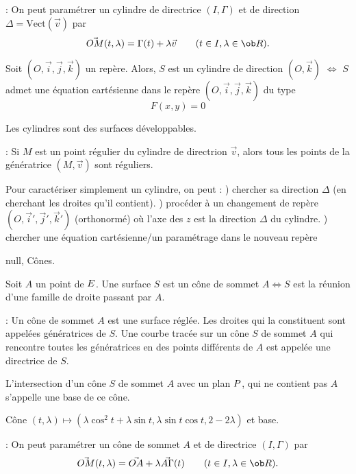 \Remarque : On peut paramétrer un cylindre de directrice $(I,\Gamma)$ et de direction $\Delta=\mbox{Vect}(\vec v)$ par 
$$
\vec{OM}(t,\lambda)=\Gamma(t)+\lambda\vec v\qquad(t\in I,\lambda\in\ob R).
$$

\Propriete [] Soit $(O,\vec i,\vec j,\vec k)$ un repère. 
Alors, $S$ est un cylindre de direction $(O,\vec k)$ $\Longleftrightarrow$ 
$S$ admet une équation cartésienne dans le repère $(O,\vec i,\vec j,\vec k)$ du type 
$$
F(x,y)=0
$$

\Propriete [] Les cylindres sont des surfaces développables. 
\bigskip

\Remarque : Si $M$ est un point régulier du cylindre de directrion $\vec v$, alors 
tous les points de la génératrice $(M,\vec v)$ sont réguliers. 
\bigskip

\Methode [] Pour caractériser simplement un cylindre, on peut : ) chercher sa direction $\Delta$ (en cherchant les droites qu'il contient). ) procéder à un changement de repère $(O,\vec i',\vec j',\vec k')$ (orthonormé) où l'axe des $z$ 
est la direction $\Delta$ du cylindre. ) chercher une équation cartésienne/un paramétrage dans le nouveau repère
\bigskip\goodbreak

\Subsection null, Cônes.

\Definition [] Soit $A$ un point de $\sc E$. Une surface $S$ est 
un cône de sommet $A\Longleftrightarrow S$ est la réunion 
d'une famille de droite passant par $A$. 
\bigskip

\Remarque : Un cône de sommet $A$ est une surface réglée. \pn 
Les droites qui la constituent sont appelées génératrices de $S$. \pn
Une courbe tracée sur un cône $S$ de sommet $A$ 
qui rencontre toutes les génératrices en des points différents de $A$ 
est appelée une directrice de $S$. 
\bigskip

\Definition [] L'intersection d'un cône $S$ de sommet $A$ avec un plan $\sc P$, 
qui ne contient pas $A$ s'appelle une base de ce cône. 
\bigskip

\centerline{%
}%
\Figure [Index=Surfaces!Cone@Cône]  Cône 
$(t,\lambda)\mapsto (\lambda\cos^2t+\lambda\sin t, \lambda\sin t\cos t,2-2\lambda)$ et base.
\bigskip

\Remarque : On peut paramétrer un cône de sommet $A$ et de directrice $(I,\Gamma)$ par 
$$
\vec{OM}(t,\lambda)=\vec{OA}+\lambda\vec{A\Gamma}(t)\qquad(t\in I,\lambda\in\ob R).
$$

